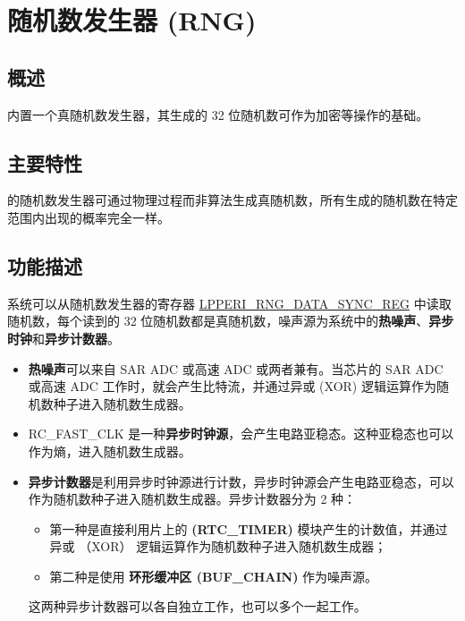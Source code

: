 \documentclass[main\_\_CN.tex]{subfiles}
\begin{document}

\ifglobal
\else
    \listoftodos
    {\let\clearpage\relax \listofdonetodos}
    \tableofcontents
\fi




\hypertarget{rng}{}
\chapter{随机数发生器 (RNG)}
\label{mod:rng}


\section{概述}

\chipname{} 内置一个真随机数发生器，其生成的 32 位随机数可作为加密等操作的基础。

\section{主要特性}

\chipname{} 的随机数发生器可通过物理过程而非算法生成真随机数，所有生成的随机数在特定范围内出现的概率完全一样。

\section{功能描述}\label{sec:rng-func-descr}

系统可以从随机数发生器的寄存器 \hyperref[regdesc:LPPERIRNGDATASYNCREG]{LPPERI\_RNG\_DATA\_SYNC\_REG} 中读取随机数，每个读到的 32 位随机数都是真随机数，噪声源为系统中的\textbf{热噪声}、\textbf{异步时钟}和\textbf{异步计数器}。

\begin{itemize}
    \item \textbf{热噪声}可以来自 SAR ADC 或高速 ADC 或两者兼有。当芯片的 SAR ADC 或高速 ADC 工作时，就会产生比特流，并通过异或 (XOR) 逻辑运算作为随机数种子进入随机数生成器。
    \item RC\_FAST\_CLK 是一种\textbf{异步时钟源}，会产生电路亚稳态。这种亚稳态也可以作为熵，进入随机数生成器。
    \item \textbf{异步计数器}是利用异步时钟源进行计数，异步时钟源会产生电路亚稳态，可以作为随机数种子进入随机数生成器。异步计数器分为 2 种：
    \begin{itemize}
        \item 第一种是直接利用片上的 \textbf{ (RTC\_TIMER)} 模块产生的计数值，并通过异或 （XOR） 逻辑运算作为随机数种子进入随机数生成器；
        \item 第二种是使用 \textbf{环形缓冲区 (BUF\_CHAIN)} 作为噪声源。
    \end{itemize}
    这两种异步计数器可以各自独立工作，也可以多个一起工作。
\end{itemize}
\end{document}
